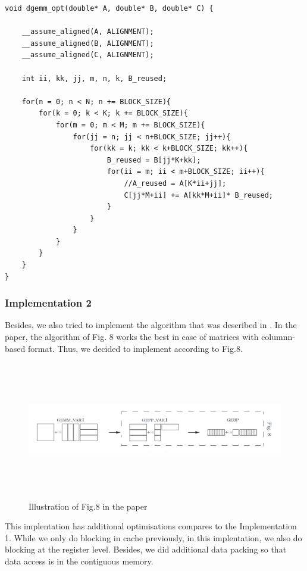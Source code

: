 \documentclass[article]{scrartcl}
\begin{document}
\begin{lstlisting}[frame=single]
void dgemm_opt(double* A, double* B, double* C) {

    __assume_aligned(A, ALIGNMENT);
    __assume_aligned(B, ALIGNMENT);
    __assume_aligned(C, ALIGNMENT);

    int ii, kk, jj, m, n, k, B_reused;

    for(n = 0; n < N; n += BLOCK_SIZE){
        for(k = 0; k < K; k += BLOCK_SIZE){
            for(m = 0; m < M; m += BLOCK_SIZE){
                for(jj = n; jj < n+BLOCK_SIZE; jj++){
                    for(kk = k; kk < k+BLOCK_SIZE; kk++){
                        B_reused = B[jj*K+kk];
                        for(ii = m; ii < m+BLOCK_SIZE; ii++){
                            //A_reused = A[K*ii+jj];
                            C[jj*M+ii] += A[kk*M+ii]* B_reused;
                        }
                    }
                }
            }
        }
    }
}
\end{lstlisting}

\subsubsection{Implementation 2}
Besides, we also tried to implement the algorithm that was described in \cite{Goto08}. In the paper, the algorithm of Fig. 8 works the best in case of matrices with columnn-based format. Thus, we decided to implement according to Fig.8.

\begin{figure}[htpb]
    \centering
    \includegraphics[width=\textwidth,height=6cm,keepaspectratio=true]{../figs/dgemm_goto1.png}
    \caption{Illustration of Fig.8 in the paper \cite{Goto08}}
    \label{fig:dgemm1}
\end{figure}

This implentation has additional optimisations compares to the Implementation 1. While we only do blocking in cache previously, in this implentation, we also do blocking at the register level. Besides, we did additional data packing so that data access is in the contiguous memory. 
\end{document}
